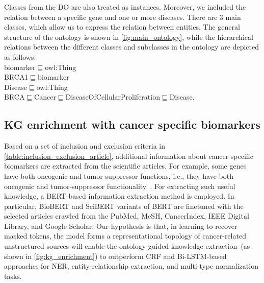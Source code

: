 \hspace*{3.5mm} Classes from the DO are also treated as instances. Moreover, we included  the relation between a specific gene and one or more diseases. There are 3 main classes, which allow us to express the relation between entities. The general structure of the ontology is shown in \cref{fig:main_ontology}, while the hierarchical relations between the different classes and subclasses in the ontology are depicted as follows: \\

\vspace{-4mm}
{\scriptsize \noindent biomarker$\sqsubseteq$owl:Thing \\
BRCA1$\sqsubseteq$biomarker\\
Disease$\sqsubseteq$owl:Thing\\
BRCA$\sqsubseteq$Cancer$\sqsubseteq$DiseaseOfCellularProliferation$\sqsubseteq$Disease.}\\
\vspace{-4mm}

\subsection{KG enrichment with cancer specific biomarkers} %
Based on a set of inclusion and exclusion criteria in \cref{table:inclusion_exclusion_article}, additional information about cancer specific biomarkers are extracted from the scientific articles. For example, some genes have both oncogenic and tumor-suppressor functions, i.e., they have both oncogenic and tumor-suppressor functionality~\cite{POSTF}. For extracting such useful knowledge, a BERT-based information extraction method is employed. In particular, BioBERT and SciBERT variants of BERT are finetuned with the selected articles crawled from the PubMed, MeSH, CancerIndex, IEEE Digital Library, and Google Scholar. Our hypothesis is that, in learning to recover masked tokens, the model forms a representational topology of cancer-related unstructured sources will enable the ontology-guided knowledge extraction~(as shown in \cref{fig:kg_enrichment}) to outperform CRF and Bi-LSTM-based approaches for NER, entity-relationship extraction, and multi-type normalization tasks. 

